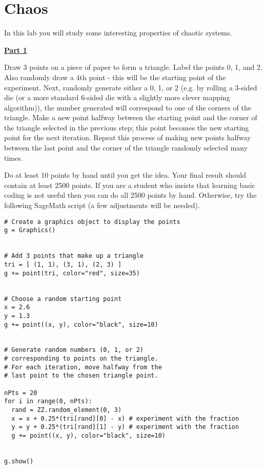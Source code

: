 \section{Chaos}

In this lab you will study some interesting properties of chaotic systems.

\vspace{\baselineskip}

\underline{\textbf{Part 1}} \par
Draw 3 points on a piece of paper to form a triangle.
Label the points 0, 1, and 2.
Also randomly draw a 4th point - this will be the starting point of the experiment.
Next, randomly generate either a 0, 1, or 2 (e.g. by rolling a 3-sided die (or a more standard 6-sided die with a slightly more clever mapping algorithm)), the number generated will correspond to one of the corners of the triangle.
Make a new point halfway between the starting point and the corner of the triangle selected in the previous step; this point becomes the new starting point for the next iteration.
Repeat this process of making new points halfway between the last point and the corner of the triangle randomly selected many times.

\vspace{\baselineskip}

Do at least 10 points by hand until you get the idea.
Your final result should contain at least 2500 points.
If you are a student who insists that learning basic coding is not useful then you can do all 2500 points by hand.
Otherwise, try the following SageMath script (a few adjustments will be needed).

\begin{verbatim}
# Create a graphics object to display the points
g = Graphics()


# Add 3 points that make up a triangle
tri = [ (1, 1), (3, 1), (2, 3) ]
g += point(tri, color="red", size=35)


# Choose a random starting point
x = 2.6 
y = 1.3 
g += point((x, y), color="black", size=10)


# Generate random numbers (0, 1, or 2)
# corresponding to points on the triangle.
# For each iteration, move halfway from the 
# last point to the chosen triangle point.

nPts = 20
for i in range(0, nPts):
  rand = ZZ.random_element(0, 3)
  x = x + 0.25*(tri[rand][0] - x) # experiment with the fraction
  y = y + 0.25*(tri[rand][1] - y) # experiment with the fraction
  g += point((x, y), color="black", size=10)


g.show()
\end{verbatim}

